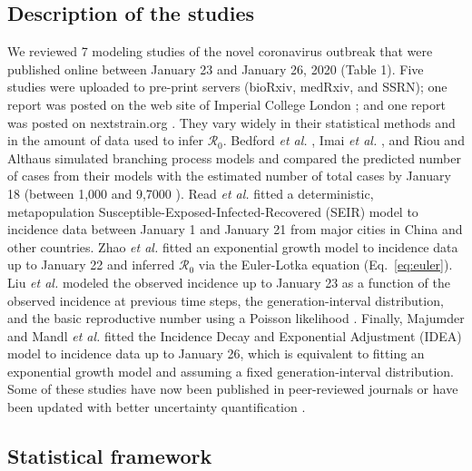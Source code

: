 \documentclass[12pt]{article}
\newcommand{\eref}[1]{Eq.~\ref{eq:#1}}
\newcommand{\Ro}{\ensuremath{{\mathcal R}_{0}}\xspace}
\begin{document}
\subsection{Description of the studies}

We reviewed 7 modeling studies of the novel coronavirus outbreak that were published online between January 23 and January 26, 2020 (Table 1).
Five studies \citep{liuncov, majumderncov, readncov, riouncov, zhaoncov} were uploaded to pre-print servers (bioRxiv, medRxiv, and SSRN); one report was posted on the web site of Imperial College London \citep{imaincov}; and one report was posted on nextstrain.org \citep{bedfordncov}.
They vary widely in their statistical methods and in the amount of data used to infer \Ro.
Bedford \textit{et al.} \cite{bedfordncov}, Imai \textit{et al.} \cite{imaincov}, and Riou and Althaus \cite{riouncov} simulated branching process models and compared the predicted number of cases from their models with the estimated number of total cases by January 18 (between 1,000 and 9,7000 \citep{imaincov0}).
Read \textit{et al.} \cite{readncov} fitted a deterministic, metapopulation Susceptible-Exposed-Infected-Recovered (SEIR) model to incidence data between January 1 and January 21 from major cities in China and other countries.
Zhao \textit{et al.} \cite{zhaoncov} fitted an exponential growth model to incidence data up to January 22 and inferred \Ro via the Euler-Lotka equation (\eref{euler}).
Liu \textit{et al.} \cite{liuncov} modeled the observed incidence up to January 23 as a function of the observed incidence at previous time steps, the generation-interval distribution, and the basic reproductive number using a Poisson likelihood \citep{forsberg2008likelihood}.
Finally, Majumder and Mandl \textit{et al.} \cite{majumderncov} fitted the Incidence Decay and Exponential Adjustment (IDEA) model \citep{fisman2013idea} to incidence data up to January 26, which is equivalent to fitting an exponential growth model and assuming a fixed generation-interval distribution.
Some of these studies have now been published in peer-reviewed journals \citep{riou2020pattern, zhao2020preliminary} or have been updated with better uncertainty quantification \citep{readncov2}.

\subsection{Statistical framework}
\end{document}
